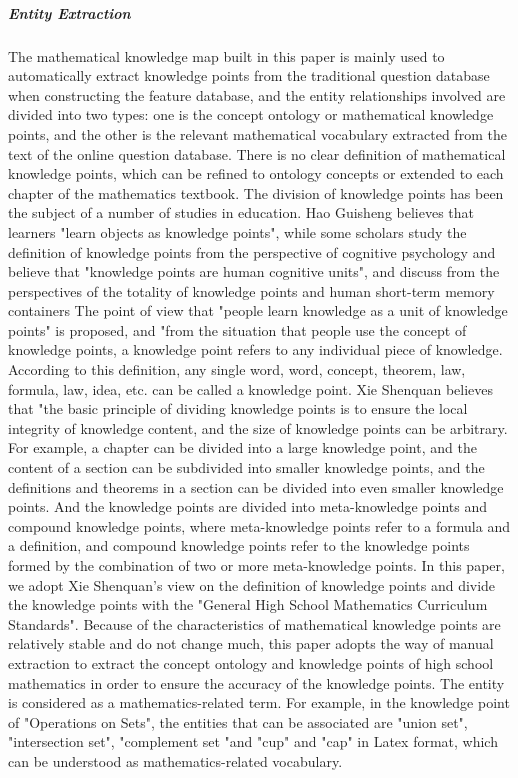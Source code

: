 \documentclass[11pt,en]{elegantpaper}
\begin{document}
\subparagraph{Entity Extraction}

The mathematical knowledge map built in this paper is mainly used to automatically extract knowledge points from the traditional question database when constructing the feature database, and the entity relationships involved are divided into two types: one is the concept ontology or mathematical knowledge points, and the other is the relevant mathematical vocabulary extracted from the text of the online question database.
There is no clear definition of mathematical knowledge points, which can be refined to ontology concepts or extended to each chapter of the mathematics textbook. The division of knowledge points has been the subject of a number of studies in education. Hao Guisheng believes that learners "learn objects as knowledge points", while some scholars study the definition of knowledge points from the perspective of cognitive psychology and believe that "knowledge points are human cognitive units", and discuss from the perspectives of the totality of knowledge points and human short-term memory containers The point of view that "people learn knowledge as a unit of knowledge points" is proposed, and "from the situation that people use the concept of knowledge points, a knowledge point refers to any individual piece of knowledge. According to this definition, any single word, word, concept, theorem, law, formula, law, idea, etc. can be called a knowledge point. Xie Shenquan believes that "the basic principle of dividing knowledge points is to ensure the local integrity of knowledge content, and the size of knowledge points can be arbitrary. For example, a chapter can be divided into a large knowledge point, and the content of a section can be subdivided into smaller knowledge points, and the definitions and theorems in a section can be divided into even smaller knowledge points. And the knowledge points are divided into meta-knowledge points and compound knowledge points, where meta-knowledge points refer to a formula and a definition, and compound knowledge points refer to the knowledge points formed by the combination of two or more meta-knowledge points. In this paper, we adopt Xie Shenquan's view on the definition of knowledge points and divide the knowledge points with the "General High School Mathematics Curriculum Standards". Because of the characteristics of mathematical knowledge points are relatively stable and do not change much, this paper adopts the way of manual extraction to extract the concept ontology and knowledge points of high school mathematics in order to ensure the accuracy of the knowledge points. The entity is considered as a mathematics-related term. For example, in the knowledge point of "Operations on Sets", the entities that can be associated are "union set", "intersection set", "complement set "and "cup" and "cap" in Latex format, which can be understood as mathematics-related vocabulary.
\end{document}
